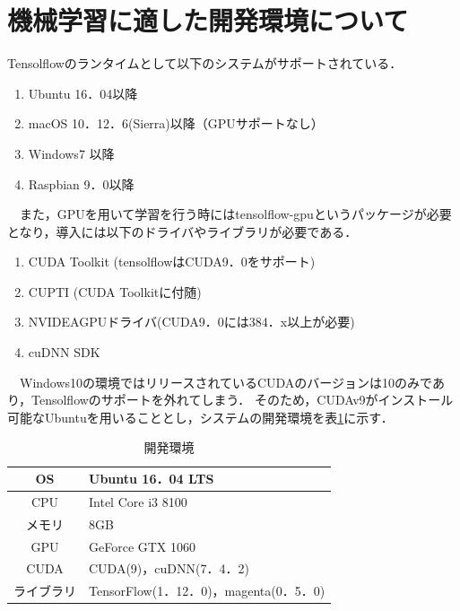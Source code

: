 \section{機械学習に適した開発環境について}
Tensolflowのランタイムとして以下のシステムがサポートされている．\cite{webpage8}
\begin{enumerate}
    \renewcommand{\labelenumi}{(\arabic{enumi})}
    \item Ubuntu 16．04以降
    \item macOS 10．12．6(Sierra)以降（GPUサポートなし）
    \item Windows7 以降
    \item Raspbian 9．0以降
\end{enumerate}
　また，GPUを用いて学習を行う時にはtensolflow-gpuというパッケージが必要となり，導入には以下のドライバやライブラリが必要である．\cite{webpage7}
\begin{enumerate}
    \renewcommand{\labelenumi}{(\arabic{enumi})}
    \item CUDA Toolkit (tensolflowはCUDA9．0をサポート)
    \item CUPTI (CUDA Toolkitに付随)
    \item NVIDEAGPUドライバ(CUDA9．0には384．x以上が必要)
    \item cuDNN SDK
\end{enumerate}
　Windows10の環境ではリリースされているCUDAのバージョンは10のみであり，Tensolflowのサポートを外れてしまう．
そのため，CUDAv9がインストール可能なUbuntuを用いることとし，システムの開発環境を表\ref{tab:開発環境}に示す．
\begin{table}[h]
\begin{center}
\caption{開発環境}
\label{tab:開発環境}
\begin{tabular}{|c|p{}|}
\hline
    OS & Ubuntu 16．04 LTS\\
    \hline
    CPU & Intel Core i3 8100\\
    \hline
    メモリ & 8GB\\
    \hline
    GPU & GeForce GTX 1060\\
    \hline
    CUDA & CUDA(9)，cuDNN(7．4．2)\\
    \hline
    ライブラリ & TensorFlow(1．12．0)，magenta(0．5．0)\\
    \hline
\end{tabular}
\end{center}
\end{table}\\
\newpage
